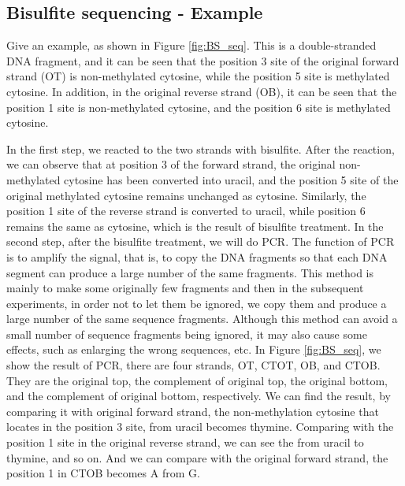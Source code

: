 \documentclass{PHlab-thesis}
\begin{document}
\subsection{Bisulfite sequencing - Example}
Give an example, as shown in Figure \ref{fig:BS_seq}. This is a double-stranded DNA fragment, and it can be seen that the position 3 site of the original forward strand (OT) is non-methylated cytosine, while the position 5 site is methylated cytosine. In addition, in the original reverse strand (OB), it can be seen that the position 1 site is non-methylated cytosine, and the position 6 site is methylated cytosine.
\par In the first step, we reacted to the two strands with bisulfite. After the reaction, we can observe that at position 3  of the forward strand, the original non-methylated cytosine has been converted into uracil, and the position 5 site of the original methylated cytosine remains unchanged as cytosine. Similarly, the position 1 site of the reverse strand is converted to uracil, while position 6 remains the same as cytosine, which is the result of bisulfite treatment.
In the second step, after the bisulfite treatment, we will do PCR. The function of PCR is to amplify the signal, that is, to copy the DNA fragments so that each DNA segment can produce a large number of the same fragments. This method is mainly to make some originally few fragments and then in the subsequent experiments, in order not to let them be ignored, we copy them and produce a large number of the same sequence fragments. Although this method can avoid a small number of sequence fragments being ignored, it may also cause some effects, such as enlarging the wrong sequences, etc. In Figure \ref{fig:BS_seq}, we show the result of PCR, there are four strands, OT, CTOT, OB, and CTOB. They are the original top, the complement of original top, the original bottom, and the complement of original bottom, respectively. We can find the result, by comparing it with original forward strand, the non-methylation cytosine that locates in the position 3 site, from uracil becomes thymine. Comparing with the position 1 site in the original reverse strand, we can see the from uracil to thymine, and so on. And we can compare with the original forward strand, the position 1 in CTOB becomes A from G.
\end{document}
